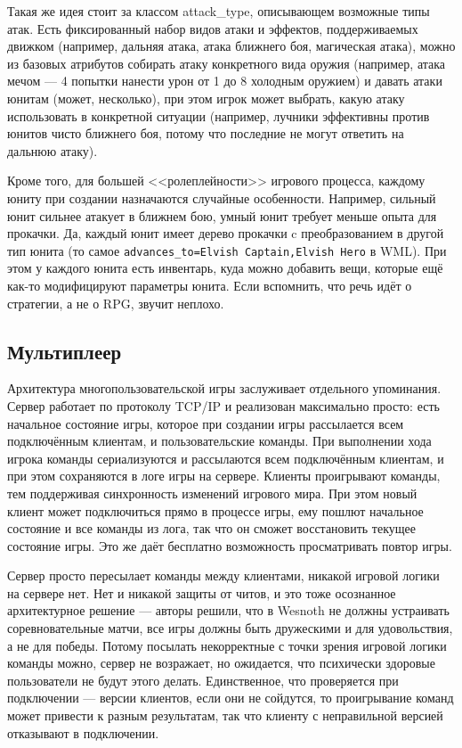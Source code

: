\documentclass{../../text-style}
\begin{document}
Такая же идея стоит за классом attack\_type, описывающем возможные типы атак. Есть фиксированный набор видов атаки и эффектов, поддерживаемых движком (например, дальняя атака, атака ближнего боя, магическая атака), можно из базовых атрибутов собирать атаку конкретного вида оружия (например, атака мечом --- 4 попытки нанести урон от 1 до 8 холодным оружием) и давать атаки юнитам (может, несколько), при этом игрок может выбрать, какую атаку использовать в конкретной ситуации (например, лучники эффективны против юнитов чисто ближнего боя, потому что последние не могут ответить на дальнюю атаку).

Кроме того, для большей <<ролеплейности>> игрового процесса, каждому юниту при создании назначаются случайные особенности. Например, сильный юнит сильнее атакует в ближнем бою, умный юнит требует меньше опыта для прокачки. Да, каждый юнит имеет дерево прокачки c преобразованием в другой тип юнита (то самое \texttt{advances_to=Elvish Captain,Elvish Hero} в WML). При этом у каждого юнита есть инвентарь, куда можно добавить вещи, которые ещё как-то модифицируют параметры юнита. Если вспомнить, что речь идёт о стратегии, а не о RPG, звучит неплохо.

\subsection{Мультиплеер}

Архитектура многопользовательской игры заслуживает отдельного упоминания. Сервер работает по протоколу TCP/IP и реализован максимально просто: есть начальное состояние игры, которое при создании игры рассылается всем подключённым клиентам, и пользовательские команды. При выполнении хода игрока команды сериализуются и рассылаются всем подключённым клиентам, и при этом сохраняются в логе игры на сервере. Клиенты проигрывают команды, тем поддерживая синхронность изменений игрового мира. При этом новый клиент может подключиться прямо в процессе игры, ему пошлют начальное состояние и все команды из лога, так что он сможет восстановить текущее состояние игры. Это же даёт бесплатно возможность просматривать повтор игры.

Сервер просто пересылает команды между клиентами, никакой игровой логики на сервере нет. Нет и никакой защиты от читов, и это тоже осознанное архитектурное решение --- авторы решили, что в Wesnoth не должны устраивать соревновательные матчи, все игры должны быть дружескими и для удовольствия, а не для победы. Потому посылать некорректные с точки зрения игровой логики команды можно, сервер не возражает, но ожидается, что психически здоровые пользователи не будут этого делать. Единственное, что проверяется при подключении --- версии клиентов, если они не сойдутся, то проигрывание команд может привести к разным результатам, так что клиенту с неправильной версией отказывают в подключении.
\end{document}
